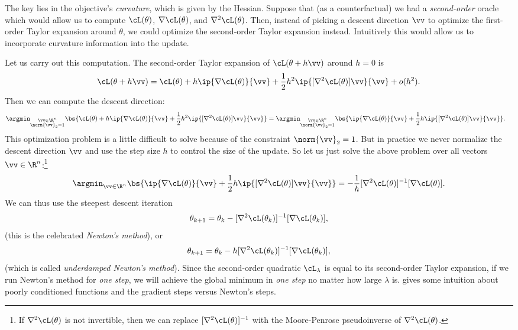 \documentclass[../../book-main.tex]{subfiles}
\begin{document}
The key lies in the objective's \textit{curvature}, which is given by the Hessian. Suppose that (as a counterfactual) we had a \textit{second-order} oracle which would allow us to compute \(\cL(\theta)\), \(\nabla \cL(\theta)\), and \(\nabla^{2}\cL(\theta)\). Then, instead of picking a descent direction \(\vv\) to optimize the first-order Taylor expansion around \(\theta\), we could optimize the second-order Taylor expansion instead. Intuitively this would allow us to incorporate curvature information into the update.

Let us carry out this computation. The second-order Taylor expansion of \(\cL(\theta + h\vv)\) around \(h = 0\) is 
\begin{equation}
    \cL(\theta + h\vv) = \cL(\theta) + h\ip{\nabla \cL(\theta)}{\vv} + \frac{1}{2}h^{2}\ip{[\nabla^{2}\cL(\theta)]\vv}{\vv} + o(h^{2}).
\end{equation}
Then we can compute the descent direction:
\begin{align}
    \argmin_{\substack{\vv \in \R^{n} \\ \norm{\vv}_{2} = 1}}\bs{\cL(\theta) + h\ip{\nabla \cL(\theta)}{\vv} + \frac{1}{2}h^{2}\ip{[\nabla^{2}\cL(\theta)]\vv}{\vv}} 
    &= \argmin_{\substack{\vv \in \R^{n} \\ \norm{\vv}_{2} = 1}}\bs{\ip{\nabla \cL(\theta)}{\vv} + \frac{1}{2}h\ip{[\nabla^{2}\cL(\theta)]\vv}{\vv}}.
\end{align}
This optimization problem is a little difficult to solve because of the constraint \(\norm{\vv}_{2} = 1\). But in practice we never normalize the descent direction \(\vv\) and use the step size \(h\) to control the size of the update. So let us just solve the above problem over all vectors \(\vv \in \R^{n}\):\footnote{If \(\nabla^{2}\cL(\theta)\) is not invertible, then we can replace \([\nabla^{2}\cL(\theta)]^{-1}\) with the Moore-Penrose pseudoinverse of \(\nabla^{2}\cL(\theta)\).}
\begin{equation}
    \argmin_{\vv \in \R^{n}}\bs{\ip{\nabla \cL(\theta)}{\vv} + \frac{1}{2}h\ip{[\nabla^{2}\cL(\theta)]\vv}{\vv}} = -\frac{1}{h}[\nabla^{2}\cL(\theta)]^{-1}[\nabla \cL(\theta)].
\end{equation}
We can thus use the steepest descent iteration 
\begin{equation}
    \theta_{k + 1} = \theta_{k} - [\nabla^{2}\cL(\theta_{k})]^{-1}[\nabla \cL(\theta_{k})],
\end{equation}
(this is the celebrated \textit{Newton's method}), or 
\begin{equation}
    \theta_{k + 1} = \theta_{k} - h[\nabla^{2}\cL(\theta_{k})]^{-1}[\nabla \cL(\theta_{k})],
\end{equation}
(which is called \textit{underdamped Newton's method}). Since the second-order quadratic \(\cL_{\lambda}\) is equal to its second-order Taylor expansion, if we run Newton's method for \textit{one step}, we will achieve the global minimum in \textit{one step} no matter how large \(\lambda\) is.  gives some intuition about poorly conditioned functions and the gradient steps versus Newton's steps.
\end{document}

